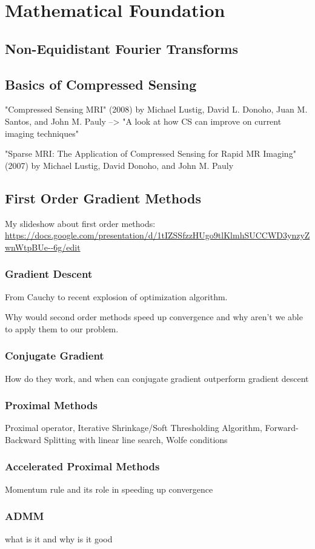 \chapter{Mathematical Foundation}

\section{Non-Equidistant Fourier Transforms}

\section{Basics of Compressed Sensing}
"Compressed Sensing MRI" (2008) by Michael Lustig, David L. Donoho, Juan M. Santos, and John M. Pauly --> "A look at how CS can improve on current imaging techniques"

"Sparse MRI: The Application of Compressed Sensing for Rapid MR Imaging" (2007) by Michael Lustig, David Donoho, and John M. Pauly

\section{First Order Gradient Methods}

My slideshow about first order methods: \url{https://docs.google.com/presentation/d/1tIZSSfzzHUgo9tlKlmhSUCCWD3ynzyZwnWtpBUe--6g/edit}

\subsection{Gradient Descent}
From Cauchy to recent explosion of optimization algorithm.

Why would second order methods speed up convergence and why aren't we able to apply them to our problem.

\subsection{Conjugate Gradient}
How do they work, and when can conjugate gradient outperform gradient descent

\subsection{Proximal Methods}
Proximal operator, Iterative Shrinkage/Soft Thresholding Algorithm, Forward-Backward Splitting with linear line search, Wolfe conditions

\subsection{Accelerated Proximal Methods}
Momentum rule and its role in speeding up convergence

\subsection{ADMM}
what is it and why is it good